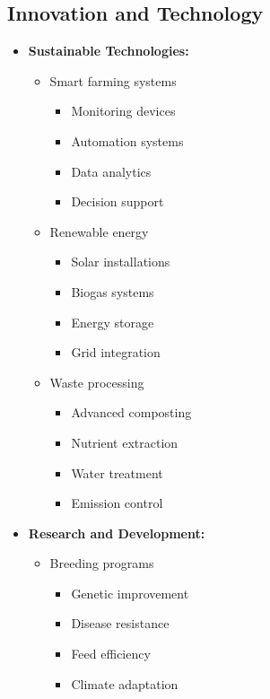 \subsection{Innovation and Technology}
\begin{itemize}
    \item \textbf{Sustainable Technologies:}
    \begin{itemize}
        \item Smart farming systems
        \begin{itemize}
            \item Monitoring devices
            \item Automation systems
            \item Data analytics
            \item Decision support
        \end{itemize}
        
        \item Renewable energy
        \begin{itemize}
            \item Solar installations
            \item Biogas systems
            \item Energy storage
            \item Grid integration
        \end{itemize}
        
        \item Waste processing
        \begin{itemize}
            \item Advanced composting
            \item Nutrient extraction
            \item Water treatment
            \item Emission control
        \end{itemize}
    \end{itemize}
    
    \item \textbf{Research and Development:}
    \begin{itemize}
        \item Breeding programs
        \begin{itemize}
            \item Genetic improvement
            \item Disease resistance
            \item Feed efficiency
            \item Climate adaptation
        \end{itemize}
        

\end{itemize}
\end{itemize}
